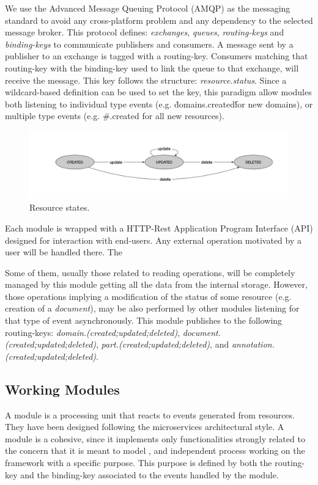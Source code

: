 We use the Advanced Message Queuing Protocol (AMQP) as the messaging standard to avoid any cross-platform problem and any dependency to the selected message broker. This protocol defines: \textit{exchanges}, \textit{queues}, \textit{routing-keys} and \textit{binding-keys} to communicate publishers and consumers. A message sent by a publisher to an exchange is tagged with a routing-key. Consumers matching that routing-key with the binding-key used to link the queue to that exchange, will receive the message. This key follows the structure: \textit{resource.status}. Since a wildcard-based definition can be used to set the key, this paradigm allow modules both listening to individual type events (e.g. \'domains.created\' for new domains), or multiple type events (e.g. \#.created for all new resources).


\begin{figure}
  \includegraphics[scale=0.3]{resource-states}
  \caption{Resource states.}
  \label{fig:librairy-states}
\end{figure}

Each module is wrapped with a HTTP-Rest Application Program Interface (API) designed for interaction with end-users. Any external operation motivated by a user will be handled there. The 


Some of them, usually those related to reading operations, will be completely managed by this module getting all the data from the internal storage. However, those operations implying a modification of the status of some resource (e.g. creation of a \textit{document}), may be also performed by other modules listening for that type of event asynchronously. This module publishes to the following routing-keys: \textit{domain.(created;updated;deleted)}, \textit{document.(created;updated;deleted)}, \textit{part.(created;updated;deleted)}, and \textit{annotation.(created;updated;deleted)}.

\subsection{Working Modules}
A module is a processing unit that reacts to events generated from resources. They have been designed following the microservices architectural style. A module is a cohesive, since it implements only functionalities strongly related to the concern that it is meant to model \cite{Dragoni2016}, and independent process working on the framework with a specific purpose. This purpose is defined by both the routing-key and the binding-key associated to the events handled by the module. 

